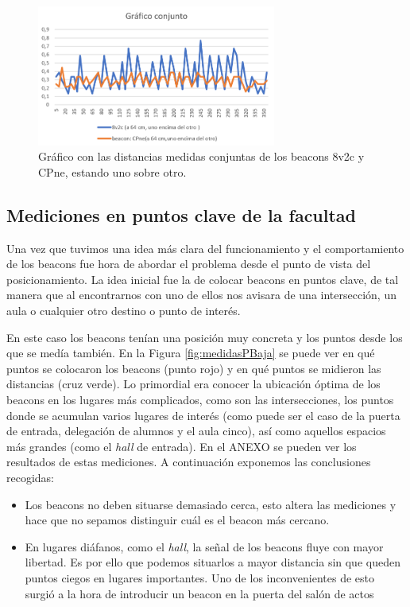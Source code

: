 \begin{figure}[t]
	\centering
	\includegraphics[width=0.7\textwidth]{Imagenes/Descripciondeltrabajo/dist_conjunto}
	\caption{Gráfico con las distancias medidas conjuntas de los beacons 8v2c y CPne, estando uno sobre otro. }
	\label{fig:dist_conjunto}
\end{figure}


\subsection{Mediciones en puntos clave de la facultad}

Una vez que tuvimos una idea más clara del funcionamiento y el comportamiento de los beacons fue hora de abordar el problema desde el punto de vista del posicionamiento. La idea inicial fue la de colocar beacons en puntos clave, de tal manera que al encontrarnos con uno de ellos nos avisara de una intersección, un aula o cualquier otro destino o punto de interés. 

En este caso los beacons tenían una posición muy concreta y los puntos desde los que se medía también. En la Figura \ref{fig:medidasPBaja} se puede ver en qué puntos se colocaron los beacons (punto rojo) y en qué puntos se midieron las distancias (cruz verde). Lo primordial era conocer la ubicación óptima de los beacons en los lugares más complicados, como son las intersecciones, los puntos donde se acumulan varios lugares de interés (como puede ser el caso de la puerta de entrada, delegación de alumnos y el aula cinco), así como aquellos espacios más grandes (como el \textit{hall} de entrada). En el ANEXO se pueden ver los resultados de estas mediciones. A continuación exponemos las conclusiones recogidas:

\begin{itemize}
	\item Los beacons no deben situarse demasiado cerca, esto altera las mediciones y hace que no sepamos distinguir cuál es el beacon más cercano. 
	\item En lugares diáfanos, como el \textit{hall}, la señal de los beacons fluye con mayor libertad. Es por ello que podemos situarlos a mayor distancia sin que queden puntos ciegos en lugares importantes. Uno de los inconvenientes de esto surgió a la hora de introducir un beacon en la puerta del salón de actos 
\end{itemize}


